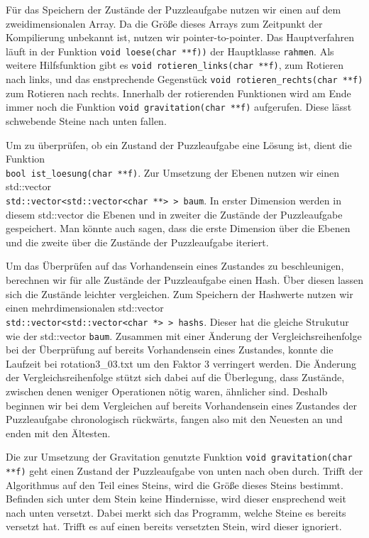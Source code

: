 Für das Speichern der Zustände der Puzzleaufgabe nutzen wir einen auf dem zweidimensionalen Array. 
Da die Größe dieses Arrays zum Zeitpunkt der Kompilierung unbekannt ist, nutzen wir pointer-to-pointer.
Das Hauptverfahren läuft in der Funktion \texttt{void loese(char **f))} der Hauptklasse \texttt{rahmen}.
Als weitere Hilfsfunktion gibt es \texttt{void rotieren\_links(char **f)}, zum Rotieren nach links, 
und das enstprechende Gegenstück \texttt{void rotieren\_rechts(char **f)} zum Rotieren nach rechts.
Innerhalb der rotierenden Funktionen wird am Ende immer noch die Funktion \texttt{void gravitation(char **f)} aufgerufen.
Diese lässt schwebende Steine nach unten fallen. 

Um zu überprüfen, ob ein Zustand der Puzzleaufgabe eine Lösung ist, dient die Funktion \\
\texttt{bool ist\_loesung(char **f)}.
Zur Umsetzung der Ebenen nutzen wir einen std::vector \\\texttt{std::vector<std::vector<char **> > baum}.
In erster Dimension werden in diesem std::vector die Ebenen und in zweiter die Zustände der Puzzleaufgabe gespeichert. 
Man könnte auch sagen, dass die erste Dimension über die Ebenen und die zweite über die Zustände der Puzzleaufgabe iteriert.

Um das Überprüfen auf das Vorhandensein eines Zustandes zu beschleunigen, berechnen wir für alle Zustände der Puzzleaufgabe einen Hash.
Über diesen lassen sich  die Zustände leichter vergleichen. Zum Speichern der Hashwerte nutzen 
wir einen mehrdimensionalen std::vector \\\texttt{std::vector<std::vector<char *> > hashs}. Dieser hat die gleiche Strukutur wie der std::vector \texttt{baum}.
 Zusammen mit einer Änderung der Vergleichsreihenfolge
bei der Überprüfung auf bereits Vorhandensein eines Zustandes, konnte die Laufzeit bei rotation3\_03.txt um den Faktor 3 verringert werden.
Die Änderung der Vergleichsreihenfolge stützt sich dabei auf die Überlegung, dass Zustände, zwischen denen weniger Operationen nötig waren, ähnlicher sind.
Deshalb beginnen wir bei dem Vergleichen auf bereits Vorhandensein eines Zustandes der Puzzleaufgabe chronologisch rückwärts, 
fangen also mit den Neuesten an und enden mit den Ältesten.

Die zur Umsetzung der Gravitation genutzte Funktion \texttt{void gravitation(char **f)} geht einen Zustand der Puzzleaufgabe von unten nach oben durch.
Trifft der Algorithmus auf den Teil eines Steins, wird die Größe dieses Steins bestimmt. Befinden sich unter dem Stein keine Hindernisse, 
wird dieser ensprechend weit nach unten versetzt. Dabei merkt sich das Programm, welche Steine es bereits versetzt hat. 
Trifft es auf einen bereits versetzten Stein, wird dieser ignoriert.